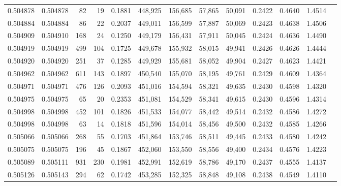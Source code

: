 \begin{tabular}{rrrrrrrrrrrrr}
0.504878 & 0.504878 &    82 &    19 &                                     0.1881 & 448,925 & 156,685 &  57,865 &  50,091 & 0.2422 & 0.4640 & 1.4514 \\
0.504884 & 0.504884 &    86 &    22 &                                     0.2037 & 449,011 & 156,599 &  57,887 &  50,069 & 0.2423 & 0.4638 & 1.4506 \\
0.504909 & 0.504910 &   168 &    24 &                                     0.1250 & 449,179 & 156,431 &  57,911 &  50,045 & 0.2424 & 0.4636 & 1.4490 \\
0.504919 & 0.504919 &   499 &   104 &                                     0.1725 & 449,678 & 155,932 &  58,015 &  49,941 & 0.2426 & 0.4626 & 1.4444 \\
0.504920 & 0.504920 &   251 &    37 &                                     0.1285 & 449,929 & 155,681 &  58,052 &  49,904 & 0.2427 & 0.4623 & 1.4421 \\
0.504962 & 0.504962 &   611 &   143 &                                     0.1897 & 450,540 & 155,070 &  58,195 &  49,761 & 0.2429 & 0.4609 & 1.4364 \\
0.504971 & 0.504971 &   476 &   126 &                                     0.2093 & 451,016 & 154,594 &  58,321 &  49,635 & 0.2430 & 0.4598 & 1.4320 \\
0.504975 & 0.504975 &    65 &    20 &                                     0.2353 & 451,081 & 154,529 &  58,341 &  49,615 & 0.2430 & 0.4596 & 1.4314 \\
0.504998 & 0.504998 &   452 &   101 &                                     0.1826 & 451,533 & 154,077 &  58,442 &  49,514 & 0.2432 & 0.4586 & 1.4272 \\
0.504998 & 0.504998 &    63 &    14 &                                     0.1818 & 451,596 & 154,014 &  58,456 &  49,500 & 0.2432 & 0.4585 & 1.4266 \\
0.505066 & 0.505066 &   268 &    55 &                                     0.1703 & 451,864 & 153,746 &  58,511 &  49,445 & 0.2433 & 0.4580 & 1.4242 \\
0.505075 & 0.505075 &   196 &    45 &                                     0.1867 & 452,060 & 153,550 &  58,556 &  49,400 & 0.2434 & 0.4576 & 1.4223 \\
0.505089 & 0.505111 &   931 &   230 &                                     0.1981 & 452,991 & 152,619 &  58,786 &  49,170 & 0.2437 & 0.4555 & 1.4137 \\
0.505126 & 0.505143 &   294 &    62 &                                     0.1742 & 453,285 & 152,325 &  58,848 &  49,108 & 0.2438 & 0.4549 & 1.4110 \\

\end{tabular}

